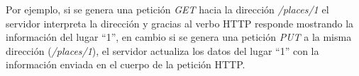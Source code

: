 


  Por ejemplo, si se genera una petición \emph{GET} hacia la dirección
  \mbox{\emph{/places/1}}  el servidor interpreta la dirección y gracias al verbo HTTP responde
  mostrando la información del lugar “1”, en cambio si se genera
  una petición \emph{PUT} a la misma dirección (\emph{/places/1}), el servidor actualiza los datos del lugar ``1'' con la información enviada en el cuerpo de la petición HTTP. \\

